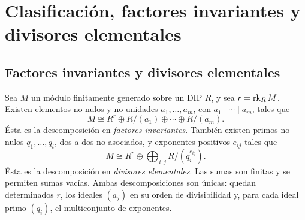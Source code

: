 \section{Clasificación, factores invariantes y divisores elementales}\label{sec:modulos-clasificacion}

\subsection{Factores invariantes y divisores elementales}\label{tema:21-2-2b}
\begin{teo}\label{teo:C21-clasificacion}
Sea $M$ un módulo finitamente generado sobre un DIP $R$, y sea $r=\operatorname{rk}_R M$. Existen elementos no nulos y no unidades $a_1,\ldots,a_m$, con $a_1\mid\cdots\mid a_m$, tales que
\[
M\cong R^r\oplus R/(a_1)\oplus\cdots\oplus R/(a_m).
\]
Ésta es la descomposición en \emph{factores invariantes}. También existen primos no nulos $q_1,\ldots,q_t$, dos a dos no asociados, y exponentes positivos $e_{ij}$ tales que
\[
M\cong R^r\oplus\bigoplus_{i,j}R/(q_i^{e_{ij}}).
\]
Ésta es la descomposición en \emph{divisores elementales}. Las sumas son finitas y se permiten sumas vacías. Ambas descomposiciones son únicas: quedan determinados $r$, los ideales $(a_j)$ en su orden de divisibilidad y, para cada ideal primo $(q_i)$, el multiconjunto de exponentes.
\end{teo}
